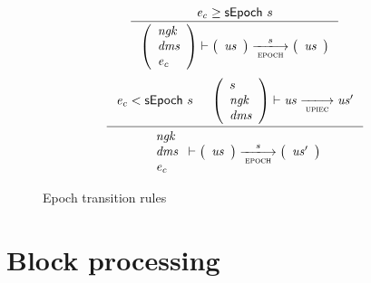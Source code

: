\documentclass[11pt,a4paper]{article}
\newcommand{\var}[1]{\mathit{#1}}
\newcommand{\trans}[2]{\xlongrightarrow[\textsc{#1}]{#2}}
\begin{document}
\begin{figure}[ht]
  \begin{equation*}
    \inference
    {
      \var{e_c} \geq \sepoch{s}
    }
    {
      {\left(
        \begin{array}{l}
          \var{ngk}\\
          \var{dms}\\
          \var{e_c}
        \end{array}
      \right)}
      \vdash
      {
        \left(
          {\begin{array}{c}
             \var{us}
           \end{array}
         }
       \right)
     }
     \trans{epoch}{s}
     {
       \left(
         {\begin{array}{c}
            \var{us}
          \end{array}
        }
      \right)
    }
  }
\end{equation*}
\vspace{20pt}
\begin{equation*}
  \inference
  {
    \var{e_c} < \sepoch{s}
    &
    {\left(
        \begin{array}{l}
          s\\
          \var{ngk}\\
          \var{dms}
        \end{array}
      \right)
    }
    \vdash \var{us} \trans{upiec}{} \var{us'}
  }
  {
    {
      \begin{array}{l}
        \var{ngk}\\
        \var{dms}\\
        \var{e_c}
      \end{array}
    }
    \vdash
    {
      \left(
        {\begin{array}{c}
           \var{us}
         \end{array}
       }
     \right)
   }
   \trans{epoch}{s}
   {
     \left(
       {\begin{array}{c}
          \var{us'}
        \end{array}
      }
    \right)
  }
}
\end{equation*}
\caption{Epoch transition rules}
\label{fig:rules:epoch}
\end{figure}

\clearpage

\section{Block processing}
\label{sec:block-processing}
\end{document}
